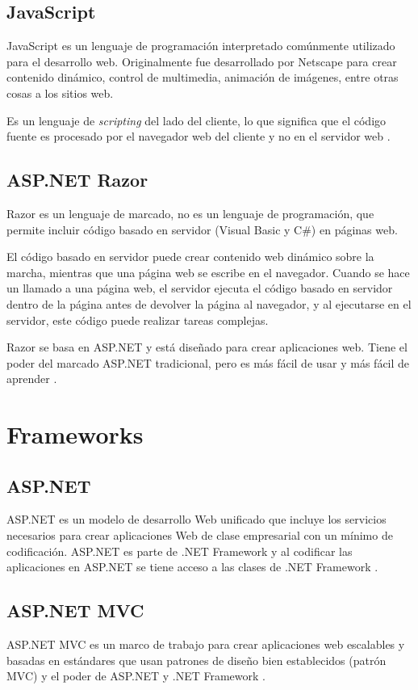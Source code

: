 \subsection{JavaScript}
JavaScript es un lenguaje de programación  interpretado comúnmente utilizado para el desarrollo web. Originalmente fue desarrollado por Netscape para crear contenido dinámico, control de multimedia, animación de imágenes, entre otras cosas a los sitios web.

Es un lenguaje de \textit{scripting} del lado del cliente, lo que significa que el código fuente es procesado por el navegador web del cliente y no en el servidor web \cite{javaScriptChristensson}.

\subsection{ASP.NET Razor}
Razor es un lenguaje de marcado, no es un lenguaje de programación, que permite incluir código basado en servidor (Visual Basic y C\#) en páginas web. 

El código basado en servidor puede crear contenido web dinámico sobre la marcha, mientras que una página web se escribe en el navegador. Cuando se hace un llamado a una página web, el servidor ejecuta el código basado en servidor dentro de la página antes de devolver la página al navegador, y al ejecutarse en el servidor, este código puede realizar tareas complejas.
 
Razor se basa en ASP.NET y está diseñado para crear aplicaciones web. Tiene el poder del marcado ASP.NET tradicional, pero es más fácil de usar y más fácil de aprender \cite{aspRazorW3school}.


\section{Frameworks}
\subsection{ASP.NET}
ASP.NET es un modelo de desarrollo Web unificado que incluye los servicios necesarios para crear aplicaciones Web de clase empresarial con un mínimo de codificación. ASP.NET es parte de .NET Framework y al codificar las aplicaciones en ASP.NET se tiene acceso a las clases de .NET Framework \cite{aspMicrosoft}.

\subsection{ASP.NET MVC}
ASP.NET MVC es un marco de trabajo para crear aplicaciones web escalables y basadas en estándares que usan patrones de diseño bien establecidos (patrón MVC) y el poder de ASP.NET y .NET Framework \cite{aspmvcMicrosoft}.

